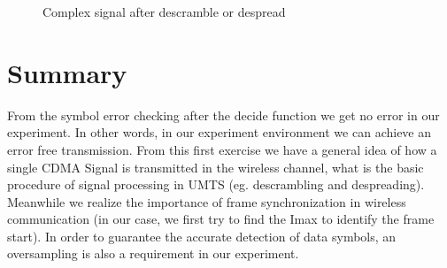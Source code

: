 \begin{figure}[H]
	\begin{center}
		\hspace{1in} %
	\end{center}
	\caption{Complex signal after descramble or despread}
	\label{fig:descrAdespr}
\end{figure}

\section{Summary}
From the symbol error checking after the decide function we get no error in our experiment. In other words, in our experiment environment we can achieve an error free transmission. From this first exercise we have a general idea of how a single CDMA Signal is transmitted in the wireless channel, what is the basic procedure of signal processing in UMTS (eg. descrambling and despreading). Meanwhile we realize the importance of frame synchronization in wireless communication (in our case, we first try to find the Imax to identify the frame start). In order to guarantee the accurate detection of data symbols, an oversampling is also a requirement in our experiment.